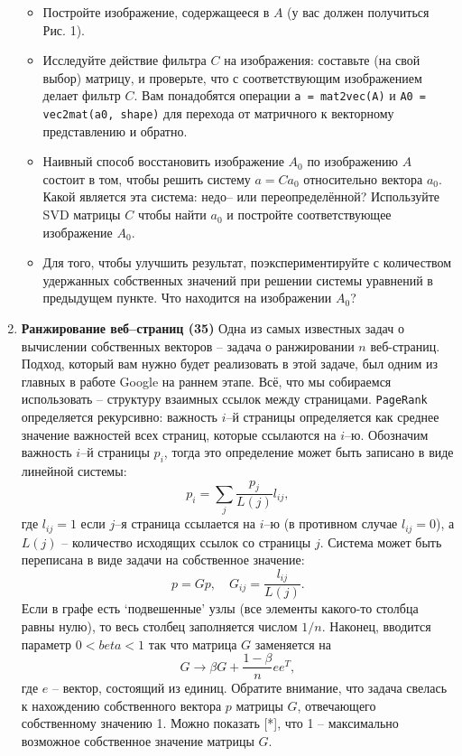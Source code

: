 \documentclass[prb,papersize=a4paper,notitlepage]{revtex4-1}%
\begin{document}
\begin{enumerate}
\begin{figure}[h!]
\label{subs}
\end{figure}
\begin{itemize}
\item Постройте изображение, содержащееся в $A$ (у вас должен получиться Рис. 1).
\item Исследуйте действие фильтра $C$ на изображения: составьте (на свой выбор) матрицу, и проверьте, что с соответствующим изображением делает фильтр $C$. Вам понадобятся операции \lstinline{a = mat2vec(A)} и \lstinline{A0 = vec2mat(a0, shape)} для перехода от матричного к векторному представлению и обратно.
\item Наивный способ восстановить изображение $A_0$ по изображению $A$ состоит в том, чтобы решить систему $a = C a_0$ относительно вектора $a_0$. Какой является эта система: недо-- или переопределённой? Используйте SVD матрицы $C$ чтобы найти $a_0$ и постройте соответствующее изображение $A_0$.
\item Для того, чтобы улучшить результат, поэкспериментируйте с количеством удержанных собственных значений при решении системы уравнений в предыдущем пункте. Что находится на изображении $A_0$?
\end{itemize}
\item \textbf{Ранжирование веб--страниц (35)} Одна из самых известных задач о вычислении собственных векторов -- задача о ранжировании $n$ веб-страниц. Подход, который вам нужно будет реализовать в этой задаче, был одним из главных в работе Google на раннем этапе. Всё, что мы собираемся использовать -- структуру взаимных ссылок между страницами. \lstinline{PageRank} определяется рекурсивно: важность $i$--й страницы определяется как среднее значение важностей всех страниц, которые ссылаются на $i$--ю. Обозначим важность $i$--й страницы $p_i$, тогда это определение может быть записано в виде линейной системы:
$$ p_i = \sum_{j} \frac{p_j}{L(j)}l_{ij}, $$
где $l_{ij}=1$ если $j$--я страница ссылается на $i$--ю (в противном случае $l_{ij}=0$), а $L(j)$ -- количество исходящих ссылок со страницы $j$. Система может быть переписана в виде задачи на собственное значение:
$$ p = G p, \quad G_{ij} = \frac{l_{ij}}{L(j)}.$$ Если в графе есть `подвешенные' узлы (все элементы какого-то столбца равны нулю), то весь столбец заполняется числом $1/n$. Наконец, вводится параметр $0<beta<1$ так что матрица $G$ заменяется на
$$
G\to \beta G + \frac{1-\beta}{n} e e^T,
$$
где $e$ -- вектор, состоящий из единиц. Обратите внимание, что задача свелась к нахождению собственного вектора $p$ матрицы $G$, отвечающего собственному значению 1.  Можно показать [*], что  1 -- максимально возможное собственное значение матрицы $G$.


\end{enumerate}
\end{document}
